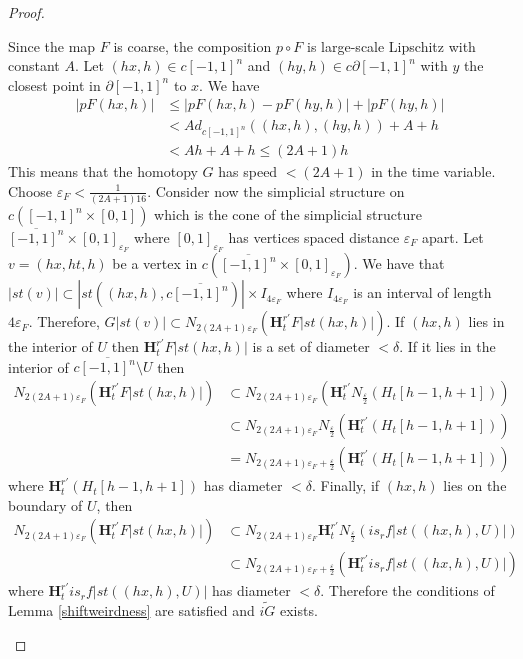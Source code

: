 \documentclass[a4paper,11pt]{article}
\theoremstyle{definition}
\theoremstyle{plain}
\theoremstyle{remark}
\begin{document}
{\begin{proof}
\begin{enumerate}
Since the map $F$ is coarse, the composition $p\circ F$ is large-scale Lipschitz with constant $A$. Let $(hx,h)\in c[-1,1]^n$ and $(hy,h)\in c\partial[-1,1]^n$ with $y$ the closest point in $\partial[-1,1]^n$ to $x$. We have
\begin{align*}
|pF(hx,h)| &\leq|pF(hx,h)-pF(hy,h)|+|pF(hy,h)| \\
&< A d_{c[-1,1]^n}((hx,h),(hy,h)) + A + h \\
&<Ah +A+h \leq (2A +1)h
\end{align*}
This means that the homotopy $G$ has speed $< (2A+1)$ in the time variable. Choose $\varepsilon_{F}<\frac{1}{(2A+1)16}$. Consider now the simplicial structure on $c([-1,1]^n \times [0,1])$ which is the cone of the simplicial structure $\overline{[-1,1]^n} \times [0,1]_{{\varepsilon}_{F}}$ where $[0,1]_{\varepsilon_{F}}$ has vertices spaced distance $\varepsilon_{F}$ apart. Let $v=(hx,ht,h)$ be a vertex in $c(\overline{[-1,1]^n} \times [0,1]_{{\varepsilon}_{F}})$. We have that $|st(v)| \subset |st((hx,h),c\overline{[-1,1]^n})|\times I_{4\varepsilon_{F}}$ where $I_{4\varepsilon_{F}}$ is an interval of length $4\varepsilon_{F}$. Therefore, $G|st(v)|\subset N_{2(2A+1)\varepsilon_{F}}(\mathbf{H}^{r'}_{t}F|st(hx,h)|)$. If $(hx,h)$ lies in the interior of  $ U$ then $\mathbf{H}^{r'}_{t}F|st(hx,h)|$ is a set of diameter $<\delta$. If it lies in the interior of $c\overline{[-1,1]^n}\setminus U$ then 
\begin{align*}
N_{2(2A+1)\varepsilon_{F}}(\mathbf{H}^{r'}_{t}F|st(hx,h)|) &\subset N_{2(2A+1)\varepsilon_{F}}(\mathbf{H}^{r'}_{t} N_{\frac{\varepsilon}{2}}(H_{t} [h-1,h+1])) \\
&\subset N_{2(2A+1)\varepsilon_{F}} N_{\frac{\varepsilon}{2}} (\mathbf{H}^{r'}_{t}(H_{t} [h-1,h+1])) \\
&= N_{2(2A+1)\varepsilon_{F} + \frac{\varepsilon}{2}} (\mathbf{H}^{r'}_{t}(H_{t} [h-1,h+1]))
\end{align*}
where $\mathbf{H}^{r'}_{t}(H_{t} [h-1,h+1])$ has diameter $<\delta$. Finally, if $(hx,h)$ lies on the boundary of $U$, then 
\begin{align*}
N_{2(2A+1)\varepsilon_{F}}(\mathbf{H}^{r'}_{t}F|st(hx,h)|) &\subset N_{2(2A+1)\varepsilon_{F}}\mathbf{H}^{r'}_{t}N_{\frac{\varepsilon}{2}} (is_{r}f |st((hx,h),U)|)\\
&\subset N_{2(2A+1)\varepsilon_{F} + \frac{\varepsilon}{2}}(\mathbf{H}^{r'}_{t}is_{r}f |st((hx,h),U)|)
\end{align*}
where $\mathbf{H}^{r'}_{t}is_{r}f |st((hx,h),U)|$ has diameter $<\delta$. Therefore the conditions of Lemma \ref{shiftweirdness} are satisfied and $\widetilde{iG}$ exists.\\


\end{enumerate}
\end{proof}}
\end{document}
